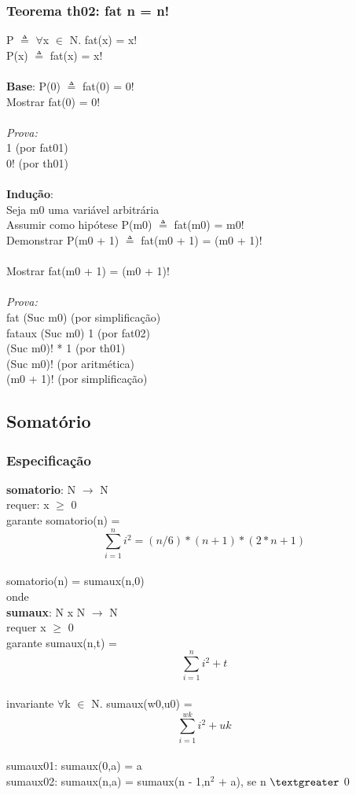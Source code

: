 \documentclass{article}
\begin{document}
\subsubsection{Teorema th02: fat n = n!}
P $\triangleq$ $\forall$x $\in$ N. fat(x) = x!
\\P(x) $\triangleq$ fat(x) = x!
\\
\\\textbf{Base}: P(0) $\triangleq$ fat(0) = 0!
\\Mostrar fat(0) = 0!
\\
\\\textit{Prova:}
\\1 (por fat01)
\\0! (por th01)
\\
\\\textbf{Indução}:
\\Seja m0 uma variável arbitrária
\\Assumir como hipótese P(m0) $\triangleq$ fat(m0) = m0!
\\Demonstrar P(m0 + 1) $\triangleq$ fat(m0 + 1) = (m0 + 1)!
\\
\\Mostrar fat(m0 + 1) = (m0 + 1)!
\\
\\\textit{Prova:}
\\fat (Suc m0) (por simplificação)
\\fataux (Suc m0) 1 (por fat02)
\\(Suc m0)! * 1 (por th01)
\\(Suc m0)! (por aritmética)
\\(m0 + 1)! (por simplificação)

\subsection{Somatório}
\subsubsection{Especificação}
\textbf{somatorio}: N $\rightarrow$ N 
\\requer: x $\ge$ 0
\\garante somatorio(n) = $$\sum_{i=1}^{n} i^{2} = (n/6) * (n + 1) * (2 * n + 1)$$ 
\\somatorio(n) = sumaux(n,0)
\\onde
\\\textbf{sumaux}: N x N $\rightarrow$ N
\\requer x $\ge$ 0
\\garante sumaux(n,t) = $$\sum_{i=1}^{n} i^{2} + t$$ 
\\invariante $\forall$k $\in$ N. sumaux(w0,u0) = $$\sum_{i=1}^{wk} i^{2} + uk$$ 
\\sumaux01: sumaux(0,a) = a
\\sumaux02: sumaux(n,a) = sumaux(n - 1,n$^{2}$ + a), se n $\textgreater$ 0
\end{document}
